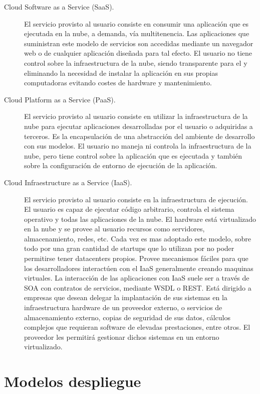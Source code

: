\begin{description}
\item[Cloud Software as a Service (SaaS).] El servicio provisto al usuario consiste en consumir una aplicación que es ejecutada en la nube, a demanda, vía multitenencia. Las aplicaciones que suministran este modelo de servicios son accedidas mediante un navegador web o de cualquier aplicación diseñada para tal efecto.  
El usuario no tiene control sobre la infraestructura de la nube, siendo transparente para el y eliminando la necesidad de instalar la aplicación en sus propias computadoras evitando costes de hardware y mantenimiento.  

\item[Cloud Platform as a Service (PaaS).] El servicio provisto al usuario consiste en utilizar la infraestructura de la nube para ejecutar aplicaciones desarrolladas por el usuario o adquiridas a terceros. 
Es la encapsulación de una abstracción del ambiente de desarrollo con sus modelos.  
El usuario no maneja ni controla la infraestructura de la nube, pero tiene control sobre la aplicación que es ejecutada y también sobre la configuración de entorno de ejecución de la aplicación. 

\item[Cloud Infraestructure as a Service (IaaS).] El servicio provisto al usuario consiste en la infraestructura de ejecución. El usuario es capaz de ejecutar código arbitrario, controla el sistema operativo y todas las aplicaciones de la nube. 
El hardware está virtualizado en la nube y se provee al usuario recursos como servidores, almacenamiento, redes, etc. Cada vez es mas adoptado este modelo, sobre todo por una gran cantidad de startups que lo utilizan por no poder permitirse tener datacenters propios. Provee mecanismos fáciles para que los desarrolladores interactúen con el IaaS generalmente creando maquinas virtuales. La interacción de las aplicaciones con IaaS suele ser a través de SOA con contratos de servicios, mediante WSDL o REST.
Está dirigido a empresas que desean delegar la implantación de sus sistemas  en la infraestructura hardware de un proveedor externo, o servicios de almacenamiento externo, copias de seguridad de sus datos, cálculos complejos que requieran software de elevadas prestaciones, entre otros. El proveedor les permitirá gestionar dichos sistemas en un entorno virtualizado. 

\end{description}

\section{Modelos despliegue}

